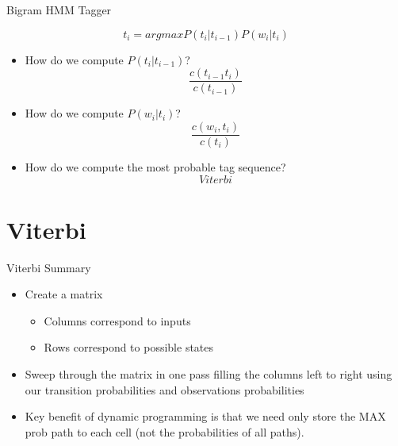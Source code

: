 \documentclass[9pt,xcolor=pdftex,dvipsnames,table]{beamer}
\begin{document}
\begin{frame}{Bigram HMM Tagger}

\begin{equation*}t_i = argmax P(t_i|t_{i-1})P(w_i|t_i)\end{equation*}

	\begin{itemize}
		\item How do we compute $P(t_i|t_{i-1})$?
			\begin{equation*}\frac{c(t_{i-1}t_i)}{c(t_{i-1})}\end{equation*}
		\item How do we compute $P(w_i|t_i)$?
			\begin{equation*}\frac{c(w_i,t_i)}{c(t_i)}\end{equation*}
		\item How do we compute the most probable tag sequence?
			\begin{equation*}Viterbi\end{equation*}
	\end{itemize}
\end{frame}

\section{Viterbi}

\begin{frame}{Viterbi Summary}

	\begin{itemize}
		\item Create a matrix
		\begin{itemize}
			\item Columns correspond to inputs
			\item Rows correspond to possible states
		\end{itemize}
		\item Sweep through the matrix in one pass filling the columns left to right using our transition probabilities and observations probabilities
		\item Key benefit of dynamic programming is that we need only store the MAX prob path to each cell (not the probabilities of all paths).
	\end{itemize}	
\end{frame}
\end{document}
